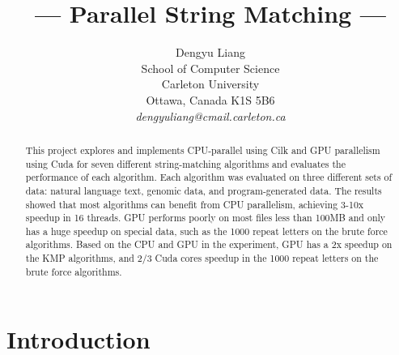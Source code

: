 \documentclass[11pt]{article}       %
\begin{document}


\title{--- Parallel String Matching ---}


\author{
Dengyu Liang\\
School of Computer Science\\
Carleton University\\
Ottawa, Canada K1S 5B6\\
{\em dengyuliang@cmail.carleton.ca}
} %

\maketitle

\begin{abstract}
This project explores and implements CPU-parallel using Cilk and GPU parallelism using Cuda for seven different string-matching algorithms and evaluates the performance of each algorithm. Each algorithm was evaluated on three different sets of data: natural language text, genomic data, and program-generated data. The results showed that most algorithms can benefit from CPU parallelism, achieving 3-10x speedup in 16 threads. GPU performs poorly on most files less than 100MB and only has a huge speedup on special data, such as the 1000 repeat letters on the brute force algorithms.  Based on the CPU and GPU in the experiment, GPU has a 2x speedup on the KMP algorithms, and 2/3 Cuda cores speedup in the 1000 repeat letters on the brute force algorithms. 
\end{abstract}

\section{Introduction}
\end{document}
